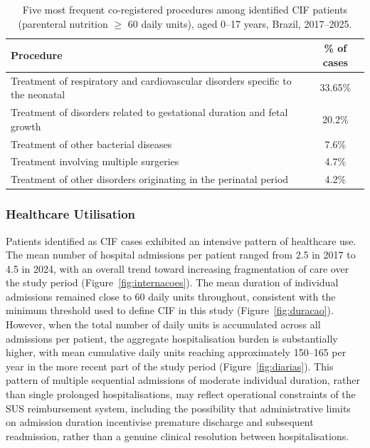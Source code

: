 \documentclass[pdflatex,sn-mathphys-num]{sn-jnl}
\theoremstyle{thmstyleone}%
\theoremstyle{thmstyletwo}%
\theoremstyle{thmstylethree}%
\begin{document}
\begin{table}[ht]
\centering
\caption{Five most frequent co-registered procedures among identified CIF patients (parenteral nutrition $\geq$ 60 daily units), aged 0--17 years, Brazil, 2017--2025.}
\label{tab:procedimentos}
\renewcommand{\arraystretch}{1.3}
\begin{tabular}{lc}
\hline
Procedure & \% of cases \\
\hline
Treatment of respiratory and cardiovascular disorders specific to the neonatal & 33.65\% \\
Treatment of disorders related to gestational duration and fetal growth & 20.2\% \\
Treatment of other bacterial diseases & 7.6\% \\
Treatment involving multiple surgeries & 4.7\% \\
Treatment of other disorders originating in the perinatal period & 4.2\% \\
\hline
\end{tabular}
\end{table}

\subsubsection*{Healthcare Utilisation}

Patients identified as CIF cases exhibited an intensive pattern of healthcare use. The mean number of hospital admissions per patient ranged from 2.5 in 2017 to 4.5 in 2024, with an overall trend toward increasing fragmentation of care over the study period (Figure~\ref{fig:internacoes}). The mean duration of individual admissions remained close to 60 daily units throughout, consistent with the minimum threshold used to define CIF in this study (Figure~\ref{fig:duracao}). However, when the total number of daily units is accumulated across all admissions per patient, the aggregate hospitalisation burden is substantially higher, with mean cumulative daily units reaching approximately 150--165 per year in the more recent part of the study period (Figure~\ref{fig:diarias}). This pattern of multiple sequential admissions of moderate individual duration, rather than single prolonged hospitalisations, may reflect operational constraints of the SUS reimbursement system, including the possibility that administrative limits on admission duration incentivise premature discharge and subsequent readmission, rather than a genuine clinical resolution between hospitalisations.
\end{document}

